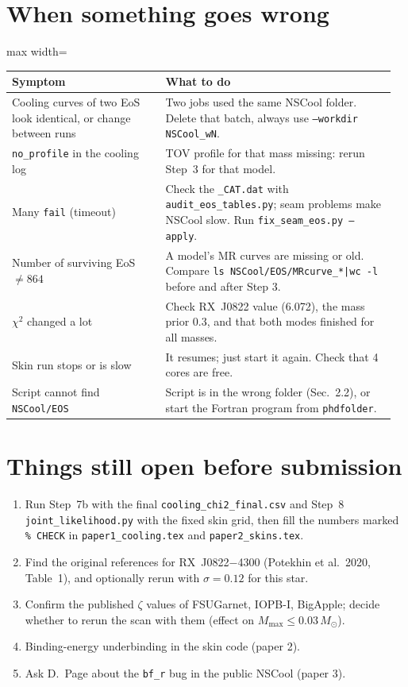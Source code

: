 \documentclass[11pt,a4paper]{article}
\newcommand{\Msun}{M_\odot}
\newcommand{\f}[1]{\texttt{#1}}
\begin{document}
\section{When something goes wrong}
\begin{adjustbox}{max width=\linewidth}
\begin{tabular}{p{0.38\linewidth}p{0.58\linewidth}}
\toprule
Symptom & What to do\\
\midrule
Cooling curves of two EoS look identical, or change between runs & Two jobs used the same NSCool folder. Delete that batch, always use \f{--workdir NSCool\_wN}.\\
\f{no\_profile} in the cooling log & TOV profile for that mass missing: rerun Step~3 for that model.\\
Many \f{fail} (timeout) & Check the \f{\_CAT.dat} with \f{audit\_eos\_tables.py}; seam problems make NSCool slow. Run \f{fix\_seam\_eos.py --apply}.\\
Number of surviving EoS $\neq864$ & A model's MR curves are missing or old. Compare \f{ls NSCool/EOS/MRcurve\_*|wc -l} before and after Step 3.\\
$\chi^2$ changed a lot & Check RX~J0822 value (6.072), the mass prior 0.3, and that both modes finished for all masses.\\
Skin run stops or is slow & It resumes; just start it again. Check that 4 cores are free.\\
Script cannot find \f{NSCool/EOS} & Script is in the wrong folder (Sec.~2.2), or start the Fortran program from \f{phdfolder}.\\
\bottomrule
\end{tabular}
\end{adjustbox}

\section{Things still open before submission}
\begin{enumerate}[leftmargin=*]
\item Run Step~7b with the final \f{cooling\_chi2\_final.csv} and Step~8 \f{joint\_likelihood.py} with the fixed skin grid, then fill the numbers marked \f{\% CHECK} in \f{paper1\_cooling.tex} and \f{paper2\_skins.tex}.
\item Find the original references for RX~J0822$-$4300 (Potekhin et al.\ 2020, Table~1), and optionally rerun with $\sigma=0.12$ for this star.
\item Confirm the published $\zeta$ values of FSUGarnet, IOPB-I, BigApple; decide whether to rerun the scan with them (effect on $M_{\max}\le0.03\,\Msun$).
\item Binding-energy underbinding in the skin code (paper 2).
\item Ask D.~Page about the \f{bf\_r} bug in the public NSCool (paper 3).
\end{enumerate}
\end{document}

